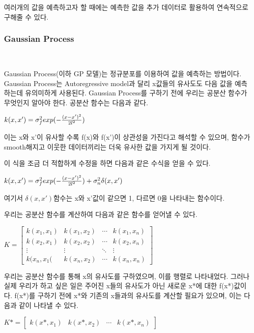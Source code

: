 \documentclass[manuscript,screen,review]{acmart}
\begin{document}
여러개의 값을 예측하고자 할 때에는 예측한 값을 추가 데이터로 활용하여 연속적으로 구해줄 수 있다.

\subsubsection{Gaussian Process}\

Gaussian Process(이하 GP 모델)는 정규분포를 이용하여 값을 예측하는 방법이다. Gaussian Process는 Autoregressive model과 달리 x값들의 유사도도 다음 값을 예측하는데 유의미하게 사용된다.
Gaussian Process를 구하기 전에 우리는 공분산 함수가 무엇인지 알아야 한다. 공분산 함수는 다음과 같다.

\begin{math}
  k(x,x') = \sigma_{f}^{2} exp(-{{(x-x')^2} \over {2l^2}})
\end{math}

이는 x와 x'이 유사할 수록 f(x)와 f(x')이 상관성을 가진다고 해석할 수 있으며, 함수가 smooth해지고 이웃한 데이터끼리는 더욱 유사한 값을 가지게 될 것이다.

이 식을 조금 더 적합하게 수정을 하면 다음과 같은 수식을 얻을 수 있다.

\begin{math}
  k(x,x') = \sigma_{f}^{2} exp(-{{(x-x')^2} \over {2l^2}}) + \sigma_n^2\delta(x,x')
\end{math}

여기서 $\delta(x,x')$함수는 x와 x'값이 같으면 1, 다르면 0을 나타내는 함수이다.

우리는 공분산 함수를 계산하여 다음과 같은 함수를 얻어낼 수 있다.

\begin{math}
  K = 
  \begin{bmatrix}
  k(x_1,x_1) & k(x_1,x_2) & \cdots & k(x_1,x_n) \\
  k(x_2,x_1) & k(x_2,x_2) & \cdots & k(x_2,x_n) \\
  \vdots & \vdots & \ddots & \vdots \\
  k(x_n,x_1( & k(x_n,x_2) & \cdots & k(x_n,x_n)
  \end{bmatrix}
\end{math}

우리는 공분산 함수를 통해 x의 유사도를 구하였으며, 이를 행렬로 나타내었다. 그러나 실제 우리가 하고 싶은 일은 주어진 x들의 유사도가 아닌 새로운 x*에 대한 f(x*)값이다. f(x*)를 구하기 전에 x*와 기존의 x들과의 유사도를 계산할 필요가 있으며, 이는 다음과 같이 나타낼 수 있다.

\begin{math}
  K* = 
  \begin{bmatrix}
  k(x*,x_1) & k(x*,x_2) & \cdots & k(x*,x_n)
  \end{bmatrix}
\end{math}
\end{document}
